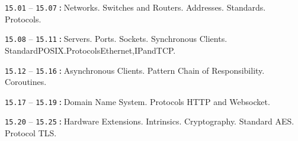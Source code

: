 \documentclass[a4paper,12pt]{article}
\renewenvironment{itemize}
{
    \begin{list}{\labelitemi}
    {
      \setlength{\topsep}{0pt}
      \setlength{\partopsep}{0pt}
      \setlength{\parskip}{0pt}
      \setlength{\itemsep}{0pt}
      \setlength{\parsep}{0pt}
      \setlength{\leftmargin}{14.5pt}
    }
}{\end{list}}
\begin{document}
\begin{itemize}

    \item \texttt{15.01} -- \texttt{15.07}\,\texttt{:}\,Networks. Switches and Routers. Addresses. Standards. Protocols.

    \smallskip

    \item \texttt{15.08} -- \texttt{15.11}\,\texttt{:}\,Servers. Ports.  Sockets. Synchronous Clients. Standard\:POSIX.\:Protocols\:Ethernet,\:IP\:and\:TCP.

    \smallskip

    \item \texttt{15.12} -- \texttt{15.16}\,\texttt{:}\,Asynchronous Clients. Pattern Chain of Responsibility. Coroutines.

    \smallskip

    \item \texttt{15.17} -- \texttt{15.19}\,\texttt{:}\,Domain Name System. Protocols HTTP and Websocket.

    \smallskip

    \item \texttt{15.20} -- \texttt{15.25}\,\texttt{:}\,Hardware Extensions. Intrinsics. Cryptography. Standard AES. Protocol TLS.
    
\end{itemize}
\end{document}
